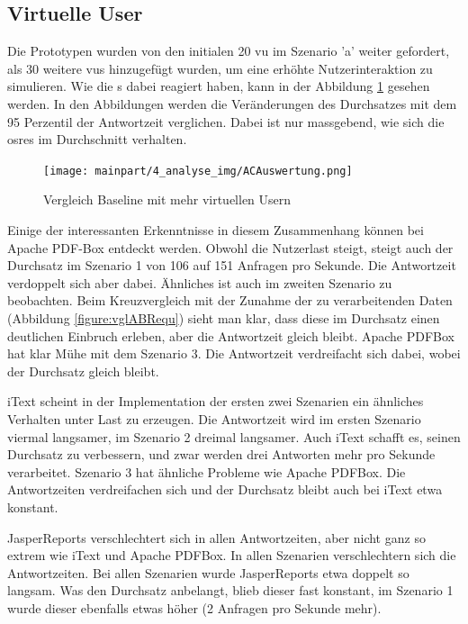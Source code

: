 \documentclass[main.tex]{subfiles}
\begin{document}
\subsection{Virtuelle User}
Die Prototypen wurden von den initialen 20 \acrshort{vu} im Szenario 'a' weiter gefordert, als 30 weitere \acrshort{vu}s hinzugefügt wurden, um eine erhöhte Nutzerinteraktion zu simulieren. Wie die s dabei reagiert haben, kann in der Abbildung \ref{figure:vglACVU} gesehen werden. In den Abbildungen werden die Veränderungen des Durchsatzes mit dem 95 Perzentil der Antwortzeit verglichen. Dabei ist nur massgebend, wie sich die \acrshort{osre}s im Durchschnitt verhalten.

\begin{figure}[!ht]
\texttt{[image: mainpart/4\_analyse\_img/ACAuswertung.png]}
 \caption{Vergleich Baseline mit mehr virtuellen Usern}
 \label{figure:vglACVU}
\end{figure}

Einige der interessanten Erkenntnisse in diesem Zusammenhang können bei Apache PDF-Box entdeckt werden. Obwohl die Nutzerlast steigt, steigt auch der Durchsatz im Szenario 1 von 106 auf 151 Anfragen pro Sekunde. Die Antwortzeit verdoppelt sich aber dabei. Ähnliches ist auch im zweiten Szenario zu beobachten. Beim Kreuzvergleich mit der Zunahme der zu verarbeitenden Daten (Abbildung \ref{figure:vglABRequ}) sieht man klar, dass diese im Durchsatz einen deutlichen Einbruch erleben, aber die Antwortzeit gleich bleibt. Apache PDFBox hat klar Mühe mit dem Szenario 3. Die Antwortzeit verdreifacht sich dabei, wobei der Durchsatz gleich bleibt.


iText scheint in der Implementation der ersten zwei Szenarien ein ähnliches Verhalten unter Last zu erzeugen. Die Antwortzeit wird im ersten Szenario viermal langsamer, im Szenario 2 dreimal langsamer. Auch iText schafft es, seinen Durchsatz zu verbessern, und zwar werden drei Antworten mehr pro Sekunde verarbeitet. Szenario 3 hat ähnliche Probleme wie Apache PDFBox. Die Antwortzeiten verdreifachen sich und der Durchsatz bleibt auch bei iText etwa konstant.

JasperReports verschlechtert sich in allen Antwortzeiten, aber nicht ganz so extrem wie iText und Apache PDFBox. In allen Szenarien verschlechtern sich die Antwortzeiten. Bei allen Szenarien wurde JasperReports etwa doppelt so langsam. Was den Durchsatz anbelangt, blieb dieser fast konstant, im Szenario 1 wurde dieser ebenfalls etwas höher (2 Anfragen pro Sekunde mehr).
\end{document}
